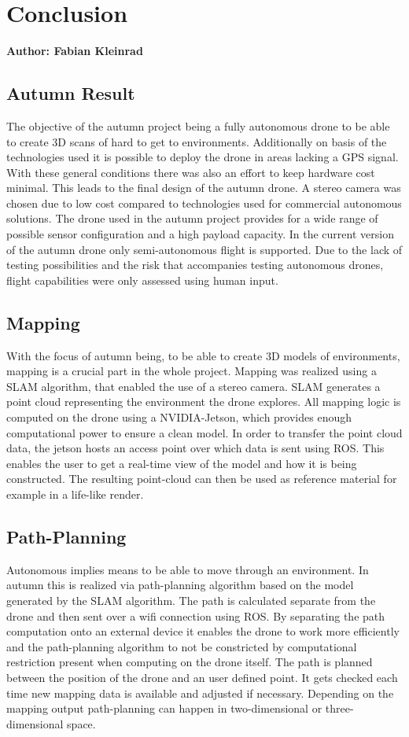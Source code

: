\chapter{Conclusion}

\textbf{Author: Fabian Kleinrad} 

\section{Autumn Result}

The objective of the autumn project being a fully autonomous drone to be able to create 3D scans of hard to get to environments. Additionally on basis of the technologies used it is possible to deploy the drone in areas lacking a GPS signal. With these general conditions there was also an effort to keep hardware cost minimal. This leads to the final design of the autumn drone. A stereo camera was chosen due to low cost compared to technologies used for commercial autonomous solutions. The drone used in the autumn project provides for a wide range of possible sensor configuration and a high payload capacity. In the current version of the autumn drone only semi-autonomous flight is supported. Due to the lack of testing possibilities and the risk that accompanies testing autonomous drones, flight capabilities were only assessed using human input.   

\section{Mapping}
With the focus of autumn being, to be able to create 3D models of environments, mapping is a crucial part in the whole project. Mapping was realized using a SLAM algorithm, that enabled the use of a stereo camera.
SLAM generates a point cloud representing the environment the drone explores. All mapping logic is computed on the drone using a NVIDIA-Jetson, which provides enough computational power to ensure a clean model. In order to transfer the point cloud data, the jetson hosts an access point over which data is sent using ROS. This enables the user to get a real-time view of the model and how it is being constructed. The resulting point-cloud can then be used as reference material for example in a life-like render.

\section{Path-Planning}
Autonomous implies means to be able to move through an environment. In autumn this is realized via path-planning algorithm based on the model generated by the SLAM algorithm. The path is calculated separate from the drone and then sent over a wifi connection using ROS. By separating the path computation onto an external device it enables the drone to work more efficiently and the path-planning algorithm to not be constricted by computational restriction present when computing on the drone itself. The path is planned between the position of the drone and an user defined point. It gets checked each time new mapping data is available and adjusted if necessary. Depending on the mapping output path-planning can happen in two-dimensional or three-dimensional space. 

